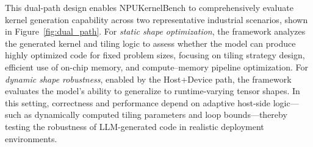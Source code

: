 This dual-path design enables NPUKernelBench to comprehensively evaluate kernel generation capability across two representative industrial scenarios, shown in Figure~\ref{fig:dual_path}. For \emph{static shape optimization}, the framework analyzes the generated kernel and tiling logic to assess whether the model can produce highly optimized code for fixed problem sizes, focusing on tiling strategy design, efficient use of on-chip memory, and compute–memory pipeline optimization. For \emph{dynamic shape robustness}, enabled by the Host+Device path, the framework evaluates the model’s ability to generalize to runtime-varying tensor shapes. In this setting, correctness and performance depend on adaptive host-side logic—such as dynamically computed tiling parameters and loop bounds—thereby testing the robustness of LLM-generated code in realistic deployment environments.


